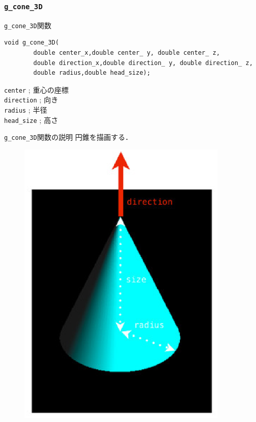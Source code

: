 \documentclass[a4paper,12pt]{jsarticle}%
\begin{document}
\begin{figure}[htb]
\end{figure}




\clearpage
\subsubsection{\texttt{g\_cone\_3D}}

\begin{itembox}[l]{\texttt{g\_cone\_3D}関数}
\begin{verbatim}
void g_cone_3D(
        double center_x,double center_ y, double center_ z,
        double direction_x,double direction_ y, double direction_ z,
        double radius,double head_size);
\end{verbatim}
\verb|center| ; 重心の座標\\
\verb|direction| ; 向き\\
\verb|radius| ; 半径\\
\verb|head_size| ; 高さ\\
\end{itembox}

\begin{itembox}[l]{\texttt{g\_cone\_3D}関数の説明}
円錐を描画する．
\end{itembox}
\begin{figure}[htb]
	\includegraphics[width=100mm]{./Figures/eps/Canvas_g_cone.eps}
\end{figure}
\end{document}
